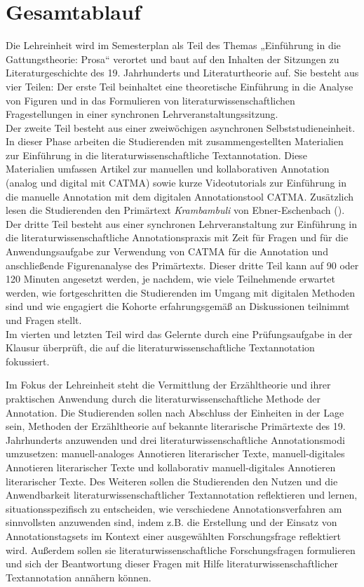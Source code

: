 \documentclass[
          a4paper,
        ]{article}
\begin{document}
\section{Gesamtablauf}\label{gesamtablauf}

Die Lehreinheit wird im Semesterplan als Teil des Themas „Einführung in
die Gattungstheorie: Prosa`` verortet und baut auf den Inhalten der
Sitzungen zu Literaturgeschichte des 19. Jahrhunderts und
Literaturtheorie auf. Sie besteht aus vier Teilen: Der erste Teil
beinhaltet eine theoretische Einführung in die Analyse von Figuren und
in das Formulieren von literaturwissenschaftlichen Fragestellungen in
einer synchronen Lehrveranstaltungssitzung.\\
Der zweite Teil besteht aus einer zweiwöchigen asynchronen
Selbststudieneinheit. In dieser Phase arbeiten die Studierenden mit
zusammengestellten Materialien zur Einführung in die
literaturwissenschaftliche Textannotation. Diese Materialien umfassen
Artikel zur manuellen und kollaborativen Annotation (analog und digital
mit CATMA) sowie kurze Videotutorials zur Einführung in die manuelle
Annotation mit dem digitalen Annotationstool CATMA. Zusätzlich lesen die
Studierenden den Primärtext \emph{Krambambuli} von Ebner-Eschenbach
().\\
Der dritte Teil besteht aus einer synchronen Lehrveranstaltung zur
Einführung in die literaturwissenschaftliche Annotationspraxis mit Zeit
für Fragen und für die Anwendungsaufgabe zur Verwendung von CATMA für
die Annotation und anschließende Figurenanalyse des Primärtexts. Dieser
dritte Teil kann auf 90 oder 120 Minuten angesetzt werden, je nachdem,
wie viele Teilnehmende erwartet werden, wie fortgeschritten die
Studierenden im Umgang mit digitalen Methoden sind und wie engagiert die
Kohorte erfahrungsgemäß an Diskussionen teilnimmt und Fragen stellt.\\
Im vierten und letzten Teil wird das Gelernte durch eine Prüfungsaufgabe
in der Klausur überprüft, die auf die literaturwissenschaftliche
Textannotation fokussiert.

Im Fokus der Lehreinheit steht die Vermittlung der Erzähltheorie und
ihrer praktischen Anwendung durch die literaturwissenschaftliche Methode
der Annotation. Die Studierenden sollen nach Abschluss der Einheiten in
der Lage sein, Methoden der Erzähltheorie auf bekannte literarische
Primärtexte des 19. Jahrhunderts anzuwenden und drei
literaturwissenschaftliche Annotationsmodi umzusetzen: manuell-analoges
Annotieren literarischer Texte, manuell-digitales Annotieren
literarischer Texte und kollaborativ manuell-digitales Annotieren
literarischer Texte. Des Weiteren sollen die Studierenden den Nutzen und
die Anwendbarkeit literaturwissenschaftlicher Textannotation
reflektieren und lernen, situationsspezifisch zu entscheiden, wie
verschiedene Annotationsverfahren am sinnvollsten anzuwenden sind, indem
z.B. die Erstellung und der Einsatz von Annotationstagsets im Kontext
einer ausgewählten Forschungsfrage reflektiert wird. Außerdem sollen sie
literaturwissenschaftliche Forschungsfragen formulieren und sich der
Beantwortung dieser Fragen mit Hilfe literaturwissenschaftlicher
Textannotation annähern können.
\end{document}
